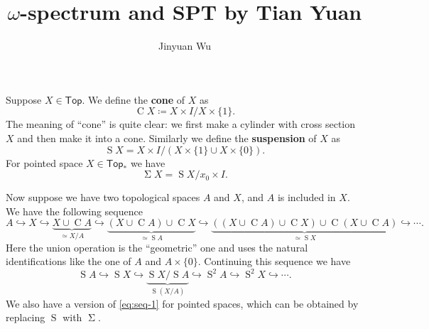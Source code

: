 \documentclass[hyperref, a4paper]{article}
\title{$\omega$-spectrum and SPT by Tian Yuan}
\author{Jinyuan Wu}
\newcommand*{\concept}[1]{{\textbf{#1}}}
\DeclareMathOperator{\cone}{C}
\DeclareMathOperator{\suspension}{S}
\DeclareMathOperator{\sigmasus}{\Sigma}
\begin{document}
\maketitle

Suppose $X \in \mathsf{Top}$. We define the \concept{cone} of $X$ as 
\begin{equation}
    \cone X \coloneqq X \times I / X \times \{1\}.
\end{equation}
The meaning of ``cone'' is quite clear: we first make a cylinder with cross section $X$ and then make it into a cone.
Similarly we define the \concept{suspension} of $X$ as 
\begin{equation}
    \suspension X = X \times I / (X \times \{1\} \cup X \times \{0\}).
\end{equation}
For pointed space $X \in \mathsf{Top}_*$ we have 
\begin{equation}
    \sigmasus X = \suspension X / x_0 \times I.
\end{equation}

Now suppose we have two topological spaces $A$ and $X$, and $A$ is included in $X$.
We have the following sequence 
\begin{equation}
    A \hookrightarrow X \hookrightarrow \underbrace{X \cup \cone A}_{\simeq X / A} 
    \hookrightarrow  \underbrace{(X \cup \cone A) \cup \cone X}_{\simeq \suspension A} 
    \hookrightarrow \underbrace{((X \cup \cone A) \cup \cone X) \cup \cone (X \cup \cone A)}_{\simeq \suspension X} 
    \hookrightarrow \cdots.
\end{equation}
Here the union operation is the ``geometric'' one and uses the natural identifications like 
the one of $A$ and $A \times \{0\}$. Continuing this sequence we have 
\begin{equation}
    \suspension A \hookrightarrow \suspension X \hookrightarrow 
    \underbrace{\suspension X / \suspension A}_{\suspension(X / A)}
    \hookrightarrow \suspension^2 A \hookrightarrow \suspension^2 X \hookrightarrow \cdots.
    \label{eq:seq-1}
\end{equation}
We also have a version of \eqref{eq:seq-1} for pointed spaces, which can be obtained by replacing $\suspension$ with $\sigmasus$.
\end{document}
